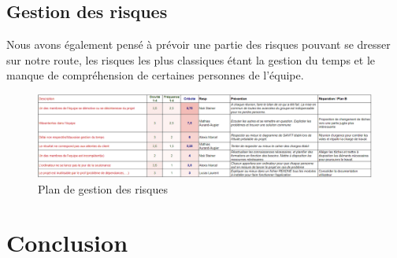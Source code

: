 \documentclass[french,a4paper]{article}
\begin{document}
\subsection{Gestion des risques}
Nous avons également pensé à prévoir une partie des risques pouvant se dresser sur notre route, les risques les plus classiques étant
la gestion du temps et le manque de compréhension de certaines personnes de l'équipe.
\begin{figure}[H]
    \centering
    \includegraphics[width=1\textwidth]{img/Plan_gestion_risque.png}
    \caption{Plan de gestion des risques}
\end{figure}

\section{Conclusion}
\end{document}
